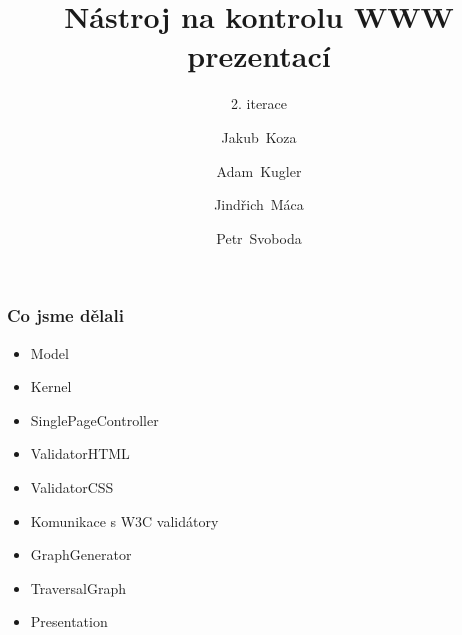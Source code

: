 \documentclass{beamer}
\begin{document}
\title [NKWP]{Nástroj na kontrolu WWW prezentací}
\author[J.~ Koza, A.~ Kugler, J.~Máca, P.~Svoboda]{Jakub~Koza \and Adam~Kugler \and Jindřich~Máca \and Petr~Svoboda}

\subtitle{2. iterace}
\frame{\titlepage}
\begin{frame}[allowframebreaks]\frametitle{Co jsme dělali}
   \begin{itemize}
    \item Model
		\item Kernel
		\item SinglePageController
		\item ValidatorHTML
		\item ValidatorCSS
		\item Komunikace s W3C validátory
		\item GraphGenerator
		\item TraversalGraph
		\item Presentation
   \end{itemize}
\end{frame}
\end{document}
